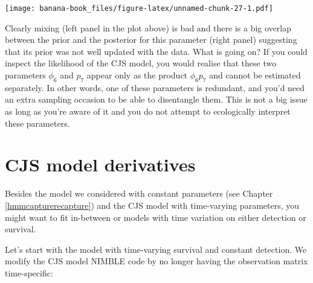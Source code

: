 \documentclass[
  12pt,
]{krantz}
\begin{document}
\texttt{[image: banana-book\_files/figure-latex/unnamed-chunk-27-1.pdf]}

Clearly mixing (left panel in the plot above) is bad and there is a big overlap between the prior and the posterior for this parameter (right panel) suggesting that its prior was not well updated with the data. What is going on? If you could inspect the likelihood of the CJS model, you would realise that these two parameters \(\phi_6\) and \(p_7\) appear only as the product \(\phi_6 p_7\) and cannot be estimated separately. In other words, one of these parameters is redundant, and you'd need an extra sampling occasion to be able to disentangle them. This is not a big issue as long as you're aware of it and you do not attempt to ecologically interpret these parameters.

\hypertarget{cjs-model-derivatives}{%
\section{CJS model derivatives}\label{cjs-model-derivatives}}

Besides the model we considered with constant parameters (see Chapter \ref{hmmcapturerecapture}) and the CJS model with time-varying parameters, you might want to fit in-between or models with time variation on either detection or survival.

Let's start with the model with time-varying survival and constant detection. We modify the CJS model NIMBLE code by no longer having the observation matrix time-specific:
\end{document}
